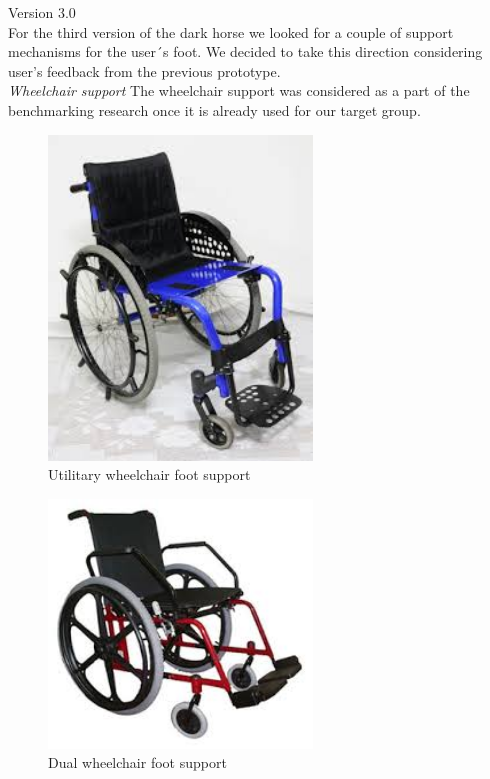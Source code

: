 Version 3.0 \\

For the third version of the dark horse we looked for a couple of support mechanisms for the user´s foot. We decided to take this direction considering user’s feedback from the previous prototype. \\

\emph{Wheelchair support} The wheelchair support was considered as a part of the benchmarking research once it is already used for our target group. 

\begin{figure}[h]
\centering
\includegraphics[width=7cm]{brazil_images/image022.jpg}
\caption{Utilitary wheelchair foot support} %
\label{fig:utilitary_wheelchair}
\end{figure}


\begin{figure}[h]
\centering
\includegraphics[width=7cm]{brazil_images/image023.jpg}
\caption{Dual wheelchair foot support}%
\label{fig:dual_wheelchair}
\end{figure}

